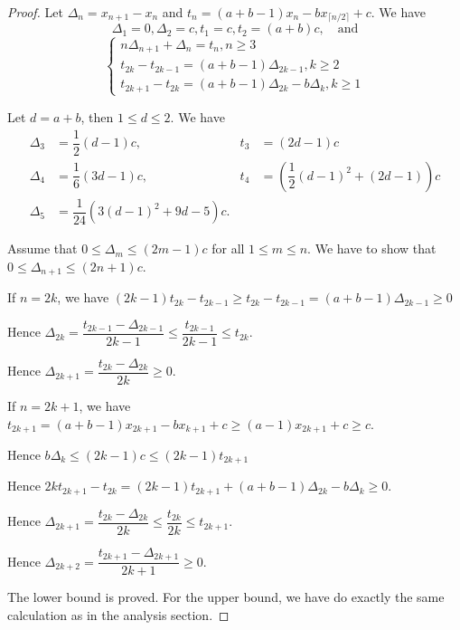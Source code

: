 \begin{proof}
  Let $\Delta_n = x_{n+1} - x_n$ and $t_n = (a+b-1)x_n - b x_{\lceil n/2\rceil} + c$. We have
  $$\Delta_1 = 0, \Delta_2 = c, t_1 = c, t_2 = (a+b)c, \quad \text{and}$$
  \begin{equation}
    \begin{cases}
      n\Delta_{n+1} + \Delta_n = t_n, n\ge 3           \\
      t_{2k} - t_{2k-1} = (a+b-1)\Delta_{2k-1}, k\ge 2 \\
      t_{2k+1} - t_{2k} = (a+b-1)\Delta_{2k} - b\Delta_{k}, k\ge 1
    \end{cases}
  \end{equation}

  Let $d = a+b$, then $1\le d\le 2$. We have
  \begin{align*}
    \Delta_3 & = \dfrac{1}{2}(d-1)c,               & t_3 & = (2d-1)c                                     \\
    \Delta_4 & = \dfrac{1}{6}\left(3d - 1\right)c, & t_4 & = \left(\dfrac{1}{2}(d-1)^2 + (2d-1)\right) c \\
    \Delta_5 & = \dfrac{1}{24}(3(d-1)^2+9d-5)c.
  \end{align*}


  Assume that $0\le \Delta_m \le (2m-1)c$ for all $1\le m\le n$. We have to show that $0\le \Delta_{n+1} \le (2n+1)c$.

  If $n=2k$, we have $(2k-1)t_{2k}-t_{2k-1} \ge t_{2k}-t_{2k-1} = (a+b-1)\Delta_{2k-1} \ge 0$

  Hence $\Delta_{2k} = \dfrac{t_{2k-1} - \Delta_{2k-1}}{2k-1}  \le \dfrac{t_{2k-1}}{2k-1} \le t_{2k}.$

  Hence $\Delta_{2k+1} = \dfrac{t_{2k} - \Delta_{2k}}{2k} \ge 0.$

  If $n=2k+1$, we have $t_{2k+1} = (a+b-1)x_{2k+1} - bx_{k+1} + c \ge (a-1)x_{2k+1} + c \ge c$.

  Hence $b\Delta_k \le (2k-1)c \le (2k-1)t_{2k+1}$

  Hence $2kt_{2k+1} - t_{2k} = (2k-1)t_{2k+1} + (a+b-1)\Delta_{2k} - b\Delta_{k} \ge 0$.

  Hence $\Delta_{2k+1} = \dfrac{t_{2k} - \Delta_{2k}}{2k} \le \dfrac{t_{2k}}{2k} \le t_{2k+1}$.

  Hence $\Delta_{2k+2} = \dfrac{t_{2k+1} - \Delta_{2k+1}}{2k+1} \ge 0$.

  The lower bound is proved. For the upper bound, we have do exactly the same calculation as in the analysis section.


\end{proof}
